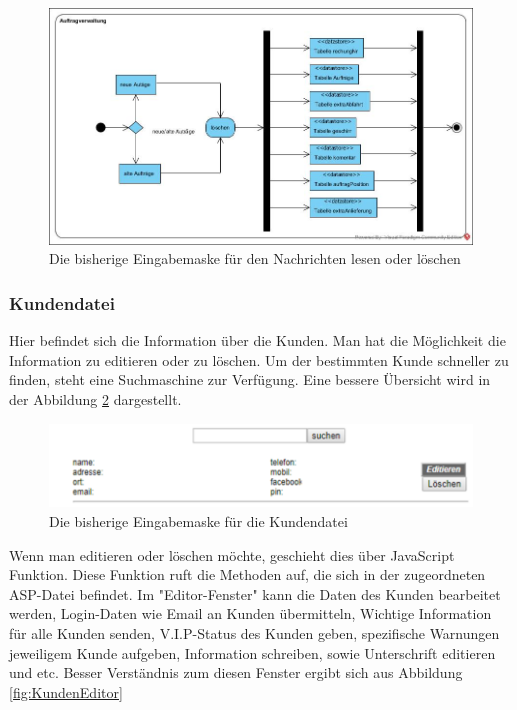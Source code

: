 \begin{figure}[h] 
	\centering
	\includegraphics[width=1\linewidth]{Graphics/Auftragverwaltung.jpg}
	\caption[auftragEinsehen]{Die bisherige Eingabemaske für den Nachrichten lesen oder löschen}
	\label{fig:auftragEinsehen}
\end{figure}

\pagebreak
\subsubsection{Kundendatei}

Hier befindet sich die Information über die Kunden. Man hat die Möglichkeit die Information zu editieren oder zu löschen. Um der bestimmten Kunde schneller zu finden, steht eine Suchmaschine zur Verfügung. Eine bessere Übersicht wird in der Abbildung \ref{fig:KundenDatei} dargestellt. 

\begin{figure}[h]
	\centering
	\includegraphics[width=0.7\linewidth]{Graphics/kundenDatei.png}
	\caption[Kundeansicht]{Die bisherige Eingabemaske für die Kundendatei}
	\label{fig:KundenDatei}
\end{figure}

Wenn man editieren oder löschen möchte, geschieht dies über JavaScript Funktion. Diese Funktion ruft die Methoden auf, die sich in der zugeordneten ASP-Datei befindet. Im "Editor-Fenster" kann die Daten des Kunden bearbeitet werden, Login-Daten wie Email an Kunden übermitteln, Wichtige Information für alle Kunden senden, V.I.P-Status des Kunden geben, spezifische Warnungen jeweiligem Kunde aufgeben, Information schreiben, sowie Unterschrift editieren und etc. Besser Verständnis zum diesen Fenster ergibt sich aus Abbildung \ref{fig:KundenEditor}



